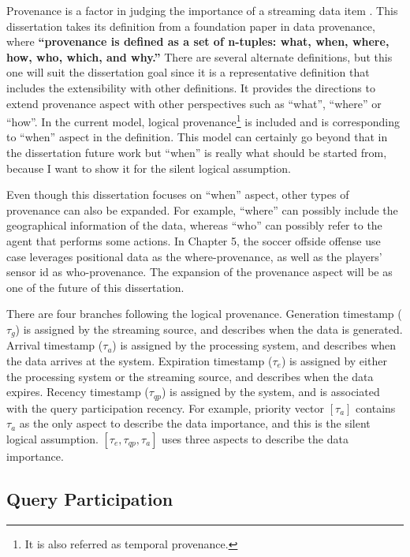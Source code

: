 Provenance is a factor in judging the importance of a streaming data item \cite{gao2010survey}.
This dissertation takes its definition from a foundation paper \cite{ram2009new} in data provenance, 
where \textbf{``provenance is defined as a set of n-tuples: what, when, where, how, who, which, and why.''}
There are several alternate definitions, but this one will suit the dissertation goal since it is a representative definition that includes the extensibility with other definitions. 
It provides the directions to extend provenance aspect with other perspectives such as ``what'', ``where'' or ``how''. 
In the current model, logical provenance\footnote{It is also referred as temporal provenance.} is included and is corresponding to ``when'' aspect in the definition.
This model can certainly go beyond that in the dissertation future work but ``when'' is really what should be started from, because I want to show it for the silent logical assumption.

Even though this dissertation focuses on ``when'' aspect, other types of provenance can also be expanded. 
For example, ``where'' can possibly include the geographical information of the data, whereas ``who'' can possibly refer to the agent that performs some actions. 
In Chapter 5, the soccer offside offense use case leverages positional data as the where-provenance, as well as the players' sensor id as who-provenance. 
The expansion of the provenance aspect will be as one of the future of this dissertation.

There are four branches following the logical provenance.
Generation timestamp ($\tau_{g}$) is assigned by the streaming source, and describes when the data is generated.
Arrival timestamp ($\tau_{a}$) is assigned by the processing system, and describes when the data arrives at the system.
Expiration timestamp ($\tau_{e}$) is assigned by either the processing system or the streaming source, and describes when the data expires.
Recency timestamp ($\tau_{qp}$) is assigned by the system, and is associated with the query participation recency.
For example, priority vector $[\tau_{a}]$ contains $\tau_{a}$ as the only aspect to describe the data importance, and this is the silent logical assumption.
$[\tau_{e}, \tau_{qp}, \tau_{a}]$ uses three aspects to describe the data importance. 
%
\subsection{Query Participation}

